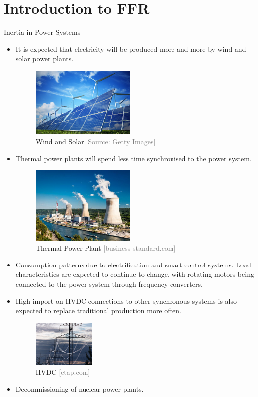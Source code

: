 \documentclass{beamer}
\begin{document}
\section{Introduction to FFR}
\begin{frame}{Inertia in Power Systems}
\begin{itemize}
\item<1-> It is expected that electricity will be produced more and more by wind and solar power plants.
 {\begin{figure}
\includegraphics[width=50mm]{Figures/WindSolar.jpg}
 \caption{Wind and Solar \textcolor{gray}{\tiny [Source: Getty Images]}}
\end{figure}}

\addtocounter{figure}{1}

\item<2-> Thermal power plants will spend less time synchronised to the power system.
 {\begin{figure}
\includegraphics[width=50mm]{Figures/ThermalPowerPlant.jpg}
\caption{Thermal Power Plant \textcolor{gray}{\tiny[business-standard.com]}}
\end{figure}}



\item<3-> Consumption patterns due to electrification and smart control systems: Load characteristics are expected to continue to change, with rotating motors being connected to the power system through frequency converters.
\item<4-> High import on HVDC connections to other synchronous systems is also expected to replace traditional production more often.
\addtocounter{figure}{1}

 {\begin{figure}
\includegraphics[width=30mm]{Figures/HVDC.jpg}
\caption{HVDC \textcolor{gray}{\tiny [etap.com]}}
\end{figure}}
\item<5-> Decommissioning of nuclear power plants.






\end{itemize}
\end{frame}
\end{document}
